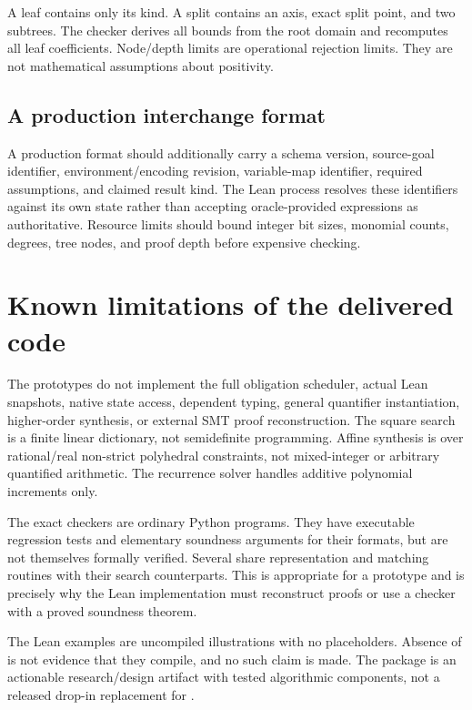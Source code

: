 A leaf contains only its kind. A split contains an axis, exact split point,
and two subtrees. The checker derives all bounds from the root domain and
recomputes all leaf coefficients. Node/depth limits are operational rejection
limits. They are not mathematical assumptions about positivity.

\subsection{A production interchange format}

A production format should additionally carry a schema version, source-goal
identifier, environment/encoding revision, variable-map identifier, required
assumptions, and claimed result kind. The Lean process resolves these
identifiers against its own state rather than accepting oracle-provided
expressions as authoritative. Resource limits should bound integer bit sizes,
monomial counts, degrees, tree nodes, and proof depth before expensive checking.

\section{Known limitations of the delivered code}

The prototypes do not implement the full obligation scheduler, actual Lean
snapshots, native \Grind{} state access, dependent typing, general quantifier
instantiation, higher-order synthesis, or external SMT proof reconstruction.
The square search is a finite linear dictionary, not semidefinite programming.
Affine synthesis is over rational/real non-strict polyhedral constraints,
not mixed-integer or arbitrary quantified arithmetic. The recurrence solver
handles additive polynomial increments only.

The exact checkers are ordinary Python programs. They have executable
regression tests and elementary soundness arguments for their formats, but
are not themselves formally verified. Several share representation and
matching routines with their search counterparts. This is appropriate for a
prototype and is precisely why the Lean implementation must reconstruct
proofs or use a checker with a proved soundness theorem.

The Lean examples are uncompiled illustrations with no 
placeholders. Absence of  is not evidence that they compile, and
no such claim is made. The package is an actionable research/design artifact
with tested algorithmic components, not a released drop-in replacement for
\Grind{}.
